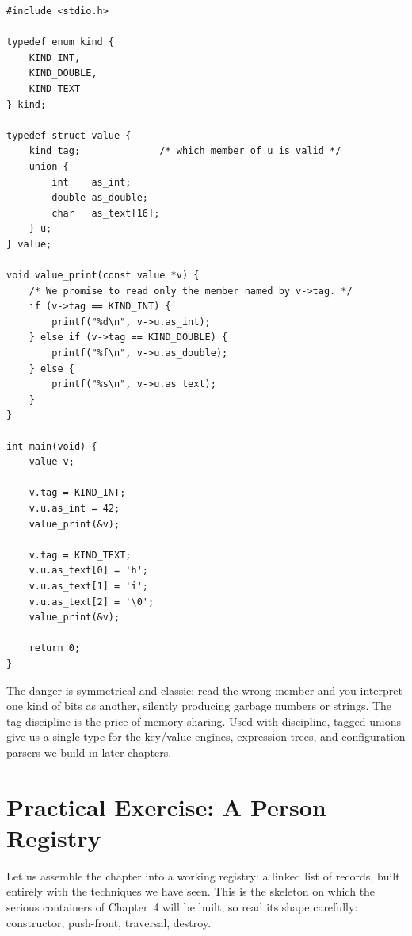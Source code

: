 \begin{lstlisting}[caption={A tagged union: kind says which member is live.}]
#include <stdio.h>

typedef enum kind {
    KIND_INT,
    KIND_DOUBLE,
    KIND_TEXT
} kind;

typedef struct value {
    kind tag;              /* which member of u is valid */
    union {
        int    as_int;
        double as_double;
        char   as_text[16];
    } u;
} value;

void value_print(const value *v) {
    /* We promise to read only the member named by v->tag. */
    if (v->tag == KIND_INT) {
        printf("%d\n", v->u.as_int);
    } else if (v->tag == KIND_DOUBLE) {
        printf("%f\n", v->u.as_double);
    } else {
        printf("%s\n", v->u.as_text);
    }
}

int main(void) {
    value v;

    v.tag = KIND_INT;
    v.u.as_int = 42;
    value_print(&v);

    v.tag = KIND_TEXT;
    v.u.as_text[0] = 'h';
    v.u.as_text[1] = 'i';
    v.u.as_text[2] = '\0';
    value_print(&v);

    return 0;
}
\end{lstlisting}

The danger is symmetrical and classic: read the wrong member and you
interpret one kind of bits as another, silently producing garbage
numbers or strings. The tag discipline is the price of memory sharing.
Used with discipline, tagged unions give us a single  type
for the key/value engines, expression trees, and configuration parsers
we build in later chapters.

\section{Practical Exercise: A Person Registry}

Let us assemble the chapter into a working registry: a linked list of
 records, built entirely with the techniques we
have seen. This is the skeleton on which the serious containers of
Chapter~4 will be built, so read its shape carefully: constructor,
push-front, traversal, destroy.

